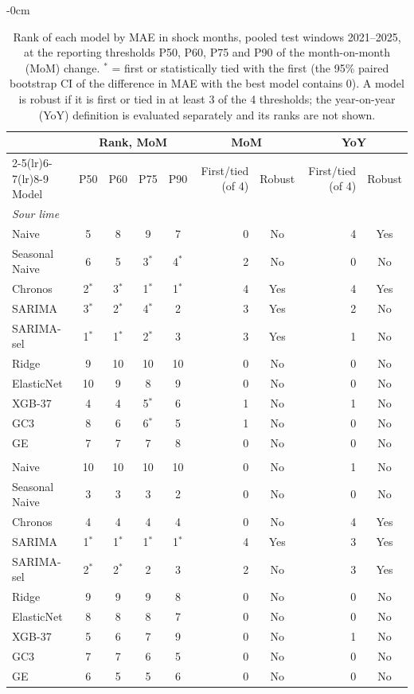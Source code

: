 \begin{table}[htbp]
\centering
\footnotesize
\setlength{\tabcolsep}{4pt}
\caption{Rank of each model by MAE in shock months, pooled test windows 2021--2025, at the reporting thresholds P50, P60, P75 and P90 of the month-on-month (MoM) change. $^{*}$ = first or statistically tied with the first (the 95\% paired bootstrap CI of the difference in MAE with the best model contains 0). A model is robust if it is first or tied in at least 3 of the 4 thresholds; the year-on-year (YoY) definition is evaluated separately and its ranks are not shown.}
\label{tab:main_robust_ranking}
\begin{adjustwidth}{-\extralength}{0cm}
\centering
\begin{tabular}{lccccrcrc}
\toprule
 & \multicolumn{4}{c}{Rank, MoM} & \multicolumn{2}{c}{MoM} & \multicolumn{2}{c}{YoY} \\
\cmidrule(lr){2-5}\cmidrule(lr){6-7}\cmidrule(lr){8-9}
Model & P50 & P60 & P75 & P90 & First/tied (of 4) & Robust & First/tied (of 4) & Robust \\
\midrule
\multicolumn{9}{l}{\textit{Sour lime}} \\
Naive & 5 & 8 & 9 & 7 & 0 & No & 4 & Yes \\
Seasonal Naive & 6 & 5 & 3$^{*}$ & 4$^{*}$ & 2 & No & 0 & No \\
Chronos & 2$^{*}$ & 3$^{*}$ & 1$^{*}$ & 1$^{*}$ & 4 & Yes & 4 & Yes \\
SARIMA & 3$^{*}$ & 2$^{*}$ & 4$^{*}$ & 2 & 3 & Yes & 2 & No \\
SARIMA-sel & 1$^{*}$ & 1$^{*}$ & 2$^{*}$ & 3 & 3 & Yes & 1 & No \\
Ridge & 9 & 10 & 10 & 10 & 0 & No & 0 & No \\
ElasticNet & 10 & 9 & 8 & 9 & 0 & No & 0 & No \\
XGB-37 & 4 & 4 & 5$^{*}$ & 6 & 1 & No & 1 & No \\
GC3 & 8 & 6 & 6$^{*}$ & 5 & 1 & No & 0 & No \\
GE & 7 & 7 & 7 & 8 & 0 & No & 0 & No \\
\addlinespace
\multicolumn{9}{l}{\textit{Sweet lime}} \\
Naive & 10 & 10 & 10 & 10 & 0 & No & 1 & No \\
Seasonal Naive & 3 & 3 & 3 & 2 & 0 & No & 0 & No \\
Chronos & 4 & 4 & 4 & 4 & 0 & No & 4 & Yes \\
SARIMA & 1$^{*}$ & 1$^{*}$ & 1$^{*}$ & 1$^{*}$ & 4 & Yes & 3 & Yes \\
SARIMA-sel & 2$^{*}$ & 2$^{*}$ & 2 & 3 & 2 & No & 3 & Yes \\
Ridge & 9 & 9 & 9 & 8 & 0 & No & 0 & No \\
ElasticNet & 8 & 8 & 8 & 7 & 0 & No & 0 & No \\
XGB-37 & 5 & 6 & 7 & 9 & 0 & No & 1 & No \\
GC3 & 7 & 7 & 6 & 5 & 0 & No & 0 & No \\
GE & 6 & 5 & 5 & 6 & 0 & No & 0 & No \\
\bottomrule
\end{tabular}
\end{adjustwidth}
\end{table}

